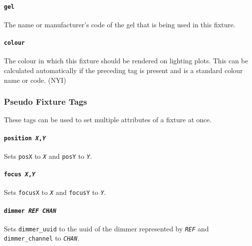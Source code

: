 \documentclass[a4paper]{article}
\begin{document}
\paragraph{\texttt{gel}}
The name or manufacturer's code of the gel that is being used in this 
fixture.

\paragraph{\texttt{colour}}
The colour in which this fixture should be rendered on lighting plots. This 
can be calculated automatically if the preceding tag is present and is a 
standard colour name or code. (NYI)

\subsubsection{Pseudo Fixture Tags}
These tags can be used to set multiple attributes of a fixture at once.

\paragraph{\texttt{position \textit{X},\textit{Y}}}
Sets \texttt{posX} to \texttt{\textit{X}} and \texttt{posY} to 
\texttt{\textit{Y}}.

\paragraph{\texttt{focus \textit{X},\textit{Y}}}
Sets \texttt{focusX} to \texttt{\textit{X}} and \texttt{focusY} to 
\texttt{\textit{Y}}.

\paragraph{\texttt{dimmer \textit{REF} \textit{CHAN}}}
Sets \texttt{dimmer\_uuid} to the uuid of the dimmer represented by 
\texttt{\textit{REF}} and \texttt{dimmer\_channel} to \texttt{\textit{CHAN}}.
\end{document}
